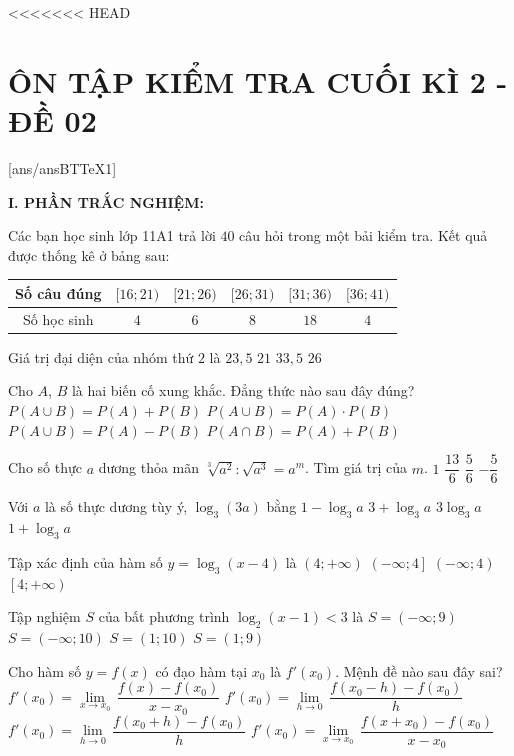 <<<<<<< HEAD
\section*{ÔN TẬP KIỂM TRA CUỐI KÌ 2 - ĐỀ 02}
\setcounter{ex}{0}\setcounter{bt}{0}
[ans/ansBTTeX1]

\noindent\textbf{I. PHẦN TRẮC NGHIỆM:}
\begin{ex}
Các bạn học sinh lớp 11A1 trả lời $40$ câu hỏi trong một bải kiểm tra. Kết quả được thống kê ở bảng sau:
\begin{center}
\begin{tabular}{|c|c|c|c|c|c|}
\hline
Số câu đúng & $[16;21)$ & $[21;26)$ & $[26;31)$ & $[31;36)$& $[36;41)$ \\
\hline
Số học sinh & $4$ & $6$ & $8$ & $18$ & $4$\\
\hline
\end{tabular}
\end{center}
Giá trị đại diện của nhóm thứ $2$ là
\choice
{\True $23{,}5$}
{$21$}
{$33{,}5$}
{$26$}
\end{ex}
\begin{ex}
Cho $A$, $B$ là hai biến cố xung khắc. Đẳng thức nào sau đây đúng?
\choice
{\True $P\left(A\cup B\right)=P(A)+P(B)$}
{$P\left(A\cup B\right)=P(A) \cdot P(B)$}
{$P\left(A\cup B\right)=P(A)-P(B)$}
{$P\left(A\cap B\right)=P(A)+P(B)$
}
\end{ex}
\begin{ex}
Cho số thực $a$ dương thỏa mãn $\sqrt[3]{a^2}\colon \sqrt{a^3}=a^m$. Tìm giá trị của $m$.
\choice
{$1$}
{$\dfrac{13}{6}$}
{$\dfrac{5}{6}$}
{\True $-\dfrac{5}{6}$}
\end{ex}
\begin{ex}
Với $a$ là số thực dương tùy ý, $\log_3(3a)$ bằng
\choice
{$1-\log_3a$}
{$3+\log_3a$}
{$3\log_3a$}
{\True $1+\log_3a$}
\end{ex}
\begin{ex}
Tập xác định của hàm số $y=\log_3(x-4)$ là
\choice
{\True $\left(4;+\infty\right)$}
{$\left(-\infty ;4\right]$}
{$\left(-\infty ;4\right)$}
{$\left[4;+\infty\right)$}
\end{ex}
\begin{ex}
Tập nghiệm $S$ của bất phương trình $\log_2(x-1)<3$ là
\choice
{$S=\left(-\infty ;9\right)$}
{$S=\left(-\infty ;10\right)$}
{$S=(1;10)$}
{\True $S=(1;9)$}
\end{ex}
\begin{ex}
Cho hàm số $y=f(x)$ có đạo hàm tại $x_0$ là $f'\left(x_0\right)$. Mệnh đề nào sau đây sai?
\choice
{$f'\left(x_0\right)= \lim \limits_{x\to x_0} \,\dfrac{f(x)-f\left(x_0\right)}{x-x_0}$}
{$f'\left(x_0\right)= \lim \limits_{h \to 0} \,\dfrac{f\left(x_0-h\right)-f\left(x_0\right)}{h}$}
{$f'\left(x_0\right)= \lim \limits_{h\to 0} \,\dfrac{f\left(x_0+h\right)-f\left(x_0\right)}{h}$}
{\True $f'\left(x_0\right)= \lim \limits_{x\to x_0} \,\dfrac{f\left(x+x_0\right)-f\left(x_0\right)}{x-x_0}$}
\end{ex}
